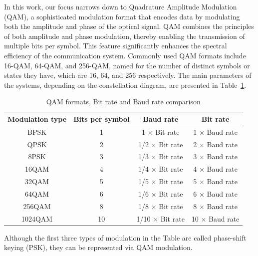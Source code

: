 In this work, our focus narrows down to Quadrature Amplitude Modulation (QAM), a sophisticated modulation format that encodes data by modulating both the amplitude and phase of the optical signal. QAM combines the principles of both amplitude and phase modulation, thereby enabling the transmission of multiple bits per symbol. This feature significantly enhances the spectral efficiency of the communication system. Commonly used QAM formats include 16-QAM, 64-QAM, and 256-QAM, named for the number of distinct symbols or states they have, which are 16, 64, and 256 respectively. The main parameters of the systems, depending on the constellation diagram, are presented in Table~\ref{tab:modulation}.
\begin{table}[h]
    \caption{QAM formats, Bit rate and Baud rate comparison}
    \begin{center}
        \begin{tabular}{cccc}
            \hline
            Modulation type & Bits per symbol & Baud rate & Bit rate\\ 
            \hline
            BPSK & 1 & 1 $\times$ Bit rate & 1 $\times$ Baud rate \\
            QPSK & 2 & 1/2 $\times$ Bit rate & 2 $\times$ Baud rate \\
            8PSK & 3 & 1/3 $\times$ Bit rate & 3 $\times$ Baud rate \\
            16QAM & 4 & 1/4 $\times$ Bit rate & 4 $\times$ Baud rate \\
            32QAM & 5 & 1/5 $\times$ Bit rate & 5 $\times$ Baud rate \\
            64QAM & 6 & 1/6 $\times$ Bit rate & 6 $\times$ Baud rate \\
            256QAM & 8 & 1/8 $\times$ Bit rate & 8 $\times$ Baud rate \\
            1024QAM & 10 & 1/10 $\times$ Bit rate & 10 $\times$ Baud rate \\
            \hline
        \end{tabular}
    \label{tab:modulation}
    \end{center}
\end{table}
Although the first three types of modulation in the Table are called phase-shift keying (PSK), they can be represented via QAM modulation. 


